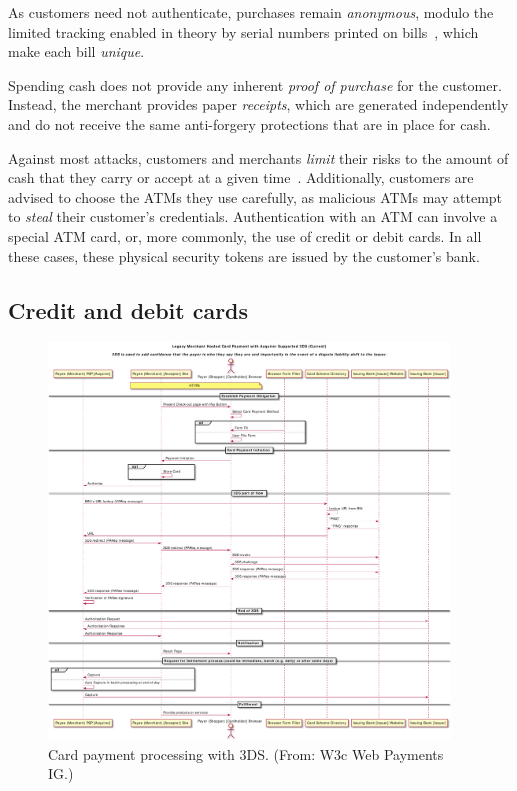 \documentclass{llncs}
\begin{document}
As customers need not authenticate, purchases remain {\em
  anonymous}, modulo the limited tracking enabled in theory
by serial numbers printed on bills~\cite{pets2004kuegler},
which make each bill {\em unique}.

Spending cash does not provide any inherent {\em proof of purchase}
for the customer. Instead, the merchant provides paper
{\em receipts}, which are generated independently and do not receive
the same anti-forgery protections that are in place for cash.

Against most attacks, customers and merchants {\em limit} their risks
to the amount of cash that they carry or accept at a given
time~\cite{Bankrate}.  Additionally, customers are advised to choose
the ATMs they use carefully, as malicious ATMs may attempt to {\em
  steal} their customer's credentials.  Authentication with an ATM can
involve a special ATM card, or, more commonly, the use of credit or
debit cards.  In all these cases, these physical security tokens are
issued by the customer's bank.


\subsection{Credit and debit cards}

\begin{figure}[h!]
\begin{center}
\includegraphics[width=0.95\textwidth]{figs/cc3ds.pdf}
\end{center}
\caption{Card payment processing with 3DS. (From: W3c Web Payments IG.)}
\label{fig:cc3ds}
\end{figure}
\end{document}
